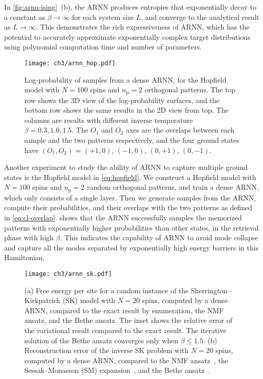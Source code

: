 In \cref{fig:arnn-ising}~(b), the ARNN produces entropies that exponentially decay to a constant as $\beta \to \infty$ for each system size $L$, and converge to the analytical result as $L \to \infty$. This demonstrates the rich expressiveness of ARNN, which has the potential to accurately approximate exponentially complex target distributions using polynomial computation time and number of parameters.

\begin{figure}[htb]
\centering
\texttt{[image: ch3/arnn\_hop.pdf]}
\caption[ARNN results of Hopfield model]{
Log-probability of samples from a dense ARNN, for the Hopfield model with $N = 100$ spins and $n_\text{p} = 2$ orthogonal patterns.
The top row shows the 3D view of the log-probability surfaces, and the bottom row shows the same results in the 2D view from top.
The columns are results with different inverse temperature $\beta = 0.3, 1.0, 1.5$.
The $O_1$ and $O_2$ axes are the overlaps between each sample and the two patterns respectively, and the four ground states have $(O_1, O_2)$ = $(+1, 0)$, $(-1, 0)$, $(0, +1)$, $(0, -1)$.
}
\label{fig:arnn-hop}
\end{figure}

Another experiment to study the ability of ARNN to capture multiple ground states is the Hopfield model in \cref{eq:hopfield}. We construct a Hopfield model with $N = 100$ spins and $n_\text{p} = 2$ random orthogonal patterns, and train a dense ARNN, which only consists of a single layer. Then we generate samples from the ARNN, compute their probabilities, and their overlaps with the two patterns as defined in \cref{eq:cl-overlap}.  shows that the ARNN successfully samples the memorized patterns with exponentially higher probabilities than other states, in the retrieval phase with high $\beta$. This indicates the capability of ARNN to avoid mode collapse and capture all the modes separated by exponentially high energy barriers in this Hamiltonian.

\begin{figure}[htb]
\centering
\texttt{[image: ch3/arnn\_sk.pdf]}
\caption[ARNN results of Sherrington--Kirkpatrick model]{
(a) Free energy per site for a random instance of the Sherrington--Kirkpatrick (SK) model with $N = 20$ spins, computed by a dense ARNN, compared to the exact result by enumeration, the NMF ansatz, and the Bethe ansatz. The inset shows the relative error of the variational result compared to the exact result.
The iterative solution of the Bethe ansatz converges only when $\beta \le 1.5$.
(b) Reconstruction error of the inverse SK problem with $N = 20$ spins, computed by a dense ARNN, compared to the NMF ansatz~\cite{roudi2009ising}, the Sessak--Monasson (SM) expansion~\cite{sessak2009small}, and the Bethe ansatz~\cite{ricci2012bethe}.
}
\label{fig:arnn-sk}
\end{figure}

